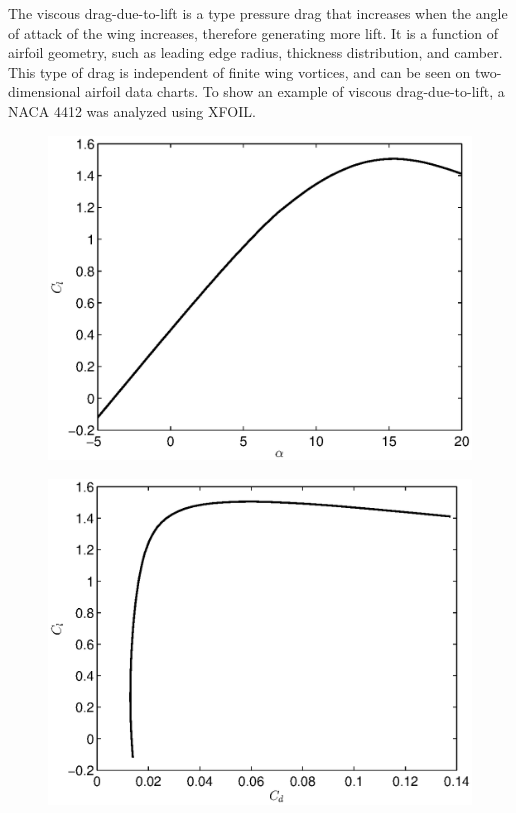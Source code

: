  The viscous drag-due-to-lift is a type pressure drag that increases when the angle of attack of the wing increases, therefore generating more lift. It is a function of airfoil geometry, such as leading edge radius, thickness distribution, and camber. This type of drag is independent of finite wing vortices, and can be seen on two-dimensional airfoil data charts. To show an example of viscous drag-due-to-lift, a NACA 4412 was analyzed using XFOIL\cite{xfoil}.
\begin{figure}[h!]
\centering
\begin{minipage}{.5\textwidth}
  \centering
  \includegraphics[width=.9\linewidth]{figures/naca4412liftcurve.eps}
  \label{naca4412liftcurve}
\end{minipage}%
\begin{minipage}{.5\textwidth}
  \centering
  \includegraphics[width=.9\linewidth]{figures/naca4412dragpolar.eps}
  \label{naca4412dragpolar}
\end{minipage}
\end{figure}

